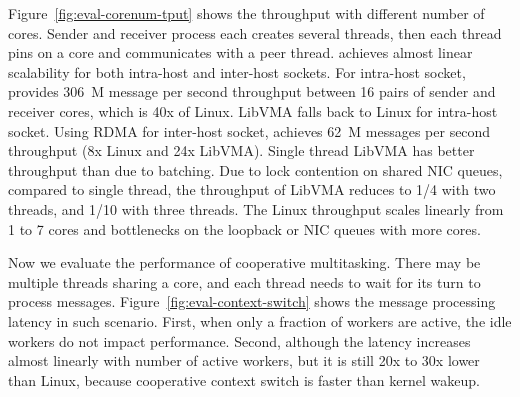 Figure~\ref{fig:eval-corenum-tput} shows the throughput with different number of cores.
Sender and receiver process each creates several threads, then each thread pins on a core and communicates with a peer thread.
\sys achieves almost linear scalability for both intra-host and inter-host sockets.
For intra-host socket, \sys provides 306~M message per second throughput between 16 pairs of sender and receiver cores, which is 40x of Linux.
LibVMA falls back to Linux for intra-host socket.
Using RDMA for inter-host socket, \sys achieves 62~M messages per second throughput (8x Linux and 24x LibVMA).
Single thread LibVMA has better throughput than \sys due to batching.
Due to lock contention on shared NIC queues, compared to single thread, the throughput of LibVMA reduces to 1/4 with two threads, and 1/10 with three threads.
The Linux throughput scales linearly from 1 to 7 cores and bottlenecks on the loopback or NIC queues with more cores.



Now we evaluate the performance of cooperative multitasking.
There may be multiple threads sharing a core, and each thread needs to wait for its turn to process messages.
Figure~\ref{fig:eval-context-switch} shows the message processing latency in such scenario.
First, when only a fraction of workers are active, the idle workers do not impact performance. 
Second, although the latency increases almost linearly with number of active workers, but it is still 20x to 30x lower than Linux, because cooperative context switch is faster than kernel wakeup.


